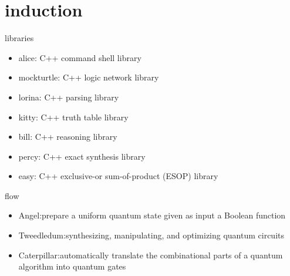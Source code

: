 \section{induction}

\begin{frame}{libraries}
  \begin{itemize}
    \item alice: C++ command shell library
    \item mockturtle: C++ logic network library
    \item lorina: C++ parsing library
    \item kitty: C++ truth table library
    \item bill: C++ reasoning library
    \item percy: C++ exact synthesis library
    \item easy: C++ exclusive-or sum-of-product (ESOP) library
  \end{itemize}
\end{frame}
\begin{frame}{flow}
  \begin{itemize}
    \item Angel:prepare a uniform quantum state
    given as input a Boolean function
    \item Tweedledum:synthesizing,
    manipulating, and optimizing quantum circuits
    \item Caterpillar:automatically translate the combinational parts of a quantum
    algorithm into quantum gates
  \end{itemize}
\end{frame}